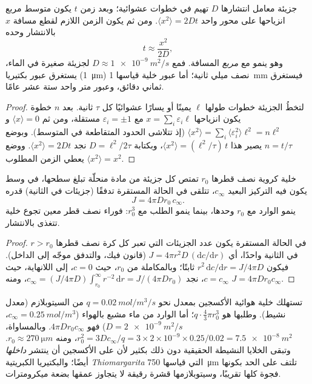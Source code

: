 \begin{theorem}\label{thm:b2:unicellular-diversity:diffusion}
جزيئة معامل انتشارها $D$ تهيم في خطوات عشوائية؛ وبعد زمن $t$ يكون
متوسط مربع انزياحها على محور واحد $\langle x^2\rangle = 2Dt$. ومن ثم
يكون الزمن اللازم لقطع مسافة $x$ بالانتشار وحده
\[
t \approx \frac{x^2}{2D},
\]
وهو ينمو مع \emph{مربع} المسافة. فمع $D \approx \qty{1e-9}{m^2/s}$
لجزيئة صغيرة في الماء، يستغرق عبور بكتيريا (\qty{1}{\micro m}) نصف
ميلي ثانية؛ أما عبور خلية قياسها \qty{1}{mm} فيستغرق ثماني دقائق،
وعبور متر واحد ستة عشر عامًا.
\end{theorem}
\begin{proof}
لتخطُ الجزيئة خطوات طولها $\ell$ يمينًا أو يسارًا عشوائيًا كل $\tau$
ثانية. بعد $n$ خطوة يكون انزياحها $x = \sum_i \varepsilon_i \ell$ مع
$\varepsilon_i = \pm 1$ مستقلة، ومن ثم $\langle x\rangle = 0$
و$\langle x^2\rangle =
\sum_i \langle\varepsilon_i^2\rangle \ell^2 = n\ell^2$ (إذ تتلاشى
الحدود المتقاطعة في المتوسط). وبوضع $n = t/\tau$ يصير هذا $\langle x^2\rangle
= (\ell^2/\tau)\,t$، وبكتابة $D = \ell^2/2\tau$ نجد
$\langle x^2\rangle = 2Dt$. ووضع $\langle x^2\rangle = x^2$ يعطي
الزمن المطلوب.
\end{proof}

\begin{theorem}\label{thm:b2:unicellular-diversity:supply}
خلية كروية نصف قطرها $r_0$ تمتص كل جزيئة من مادة منحلّة تبلغ سطحها،
في وسط يكون فيه التركيز البعيد $c_\infty$، تتلقى في الحالة
المستقرة تدفقًا (جزيئات في الثانية) قدره
\[
J = 4\pi D r_0\, c_\infty .
\]
ينمو الوارد مع $r_0$ وحدها، بينما ينمو الطلب مع $r_0^3$: فوراء نصف
قطر معين تجوع خلية تتغذى بالانتشار.
\end{theorem}
\begin{proof}
في الحالة المستقرة يكون عدد الجزيئات التي تعبر كل كرة نصف قطرها
$r > r_0$ في الثانية واحدًا، أي $J = 4\pi r^2 D\,
(\mathrm{d}c/\mathrm{d}r)$ (قانون فيك، والتدفق موجّه إلى الداخل).
فيكون $r^2\,\mathrm{d}c/\mathrm{d}r = J/4\pi D$ ثابتًا؛ وبالمكاملة
من $r_0$، حيث $c = 0$، إلى اللانهاية، حيث $c = c_\infty$، نجد
$c_\infty = (J/4\pi D)\int_{r_0}^{\infty} r^{-2}\,\mathrm{d}r =
J/(4\pi D r_0)$، ومنه $J = 4\pi D r_0 c_\infty$.
\end{proof}

\begin{example}\label{ex:b2:unicellular-diversity:howbig}
تستهلك خلية هوائية الأكسجين بمعدل نحو $q = \qty{0.02}{mol/m^3/s}$
من السيتوبلازم (معدل نشيط). وطلبها هو $q \cdot \tfrac{4}{3}\pi
r_0^3$؛ أما الوارد من ماء مشبع بالهواء ($c_\infty =
\qty{0.25}{mol/m^3}$، $D = \qty{2e-9}{m^2/s}$) فهو $4\pi D r_0
c_\infty$. وبالمساواة، $r_0^2 = 3Dc_\infty/q = 3\times 2\times 10^{-9}
\times 0.25/0.02 = \qty{7.5e-8}{m^2}$، ومنه $r_0 \approx
\qty{270}{\micro m}$. وتبقى الخلايا النشيطة الحقيقية دون ذلك بكثير
لأن على الأكسجين أن ينتشر \emph{داخلها} أيضًا؛ والبكتيريا الكبريتية
\emph{Thiomargarita} التي قياسها \qty{750}{\micro m} تلتف على الحد
بكونها فجوة كلها تقريبًا، وسيتوبلازمها قشرة رقيقة لا يتجاوز عمقها
بضعة ميكرومترات.
\end{example}

